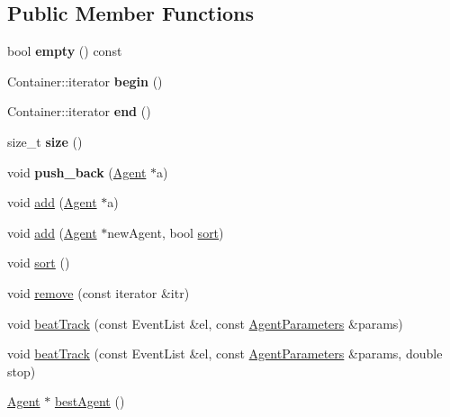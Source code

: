 \subsection*{Public Member Functions}
\begin{DoxyCompactItemize}
\item 
\mbox{\label{class_agent_list_a39c87b05a95fab15702297610aa538e9}} 
bool {\bfseries empty} () const
\item 
\mbox{\label{class_agent_list_af53de5a34a37f538f91cea23622b3ef2}} 
Container\+::iterator {\bfseries begin} ()
\item 
\mbox{\label{class_agent_list_ae1c8a6806e5d3243895a57324067fb4c}} 
Container\+::iterator {\bfseries end} ()
\item 
\mbox{\label{class_agent_list_a2096c9ef7e7f6bb6b0de028b89951c83}} 
size\+\_\+t {\bfseries size} ()
\item 
\mbox{\label{class_agent_list_a1d269d101495d0c6fdbccd67a28edbfb}} 
void {\bfseries push\+\_\+back} (\hyperlink{class_agent}{Agent} $\ast$a)
\item 
void \hyperlink{class_agent_list_ab87ca56331120c2dd7174464879acad7}{add} (\hyperlink{class_agent}{Agent} $\ast$a)
\item 
void \hyperlink{class_agent_list_abe2ceeb7ffcf4d07375677d6f238afc1}{add} (\hyperlink{class_agent}{Agent} $\ast$new\+Agent, bool \hyperlink{class_agent_list_a70c1d9daa4e814f6ebfd45f84f9ce73f}{sort})
\item 
void \hyperlink{class_agent_list_a70c1d9daa4e814f6ebfd45f84f9ce73f}{sort} ()
\item 
void \hyperlink{class_agent_list_af44adc7160efd1062dd9c631f2349aa7}{remove} (const iterator \&itr)
\item 
void \hyperlink{class_agent_list_a671100a72e0990f371c6ca892b020498}{beat\+Track} (const Event\+List \&el, const \hyperlink{class_agent_parameters}{Agent\+Parameters} \&params)
\item 
void \hyperlink{class_agent_list_a74c40095f26a193e815ae2c7e8f8269d}{beat\+Track} (const Event\+List \&el, const \hyperlink{class_agent_parameters}{Agent\+Parameters} \&params, double stop)
\item 
\hyperlink{class_agent}{Agent} $\ast$ \hyperlink{class_agent_list_af9d27edccc5f7915d4d3f554778e108c}{best\+Agent} ()
\end{DoxyCompactItemize}
